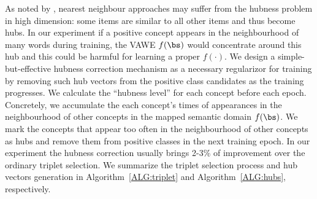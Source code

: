 \documentclass{bmvc2k}
\begin{document}
As noted by \cite{hubness2015}, nearest neighbour approaches may suffer from the hubness problem in high dimension: some items are similar to all other items and thus become hubs. In our experiment if a positive concept appears in the neighbourhood of many words during training, the VAWE $f(\bs)$ would concentrate around this hub and this could be harmful for learning a proper $f(\cdot)$. We design a simple-but-effective hubness correction mechanism as a necessary regularizor for training by removing such hub vectors from the positive class candidates as the training progresses. We calculate the ``hubness level'' for each concept before each epoch. Concretely,  we accumulate the each concept's times of appearances in the neighbourhood of other concepts in the mapped semantic domain $f(\bs)$. We mark the concepts that appear too often in the neighbourhood of other concepts as hubs and remove them from positive classes in the next training epoch. In our experiment the hubness correction usually brings 2-3\% of improvement over the ordinary triplet selection. We summarize the triplet selection process and hub vectors generation in Algorithm~\ref{ALG:triplet} and Algorithm~\ref{ALG:hubs}, respectively.
\end{document}
